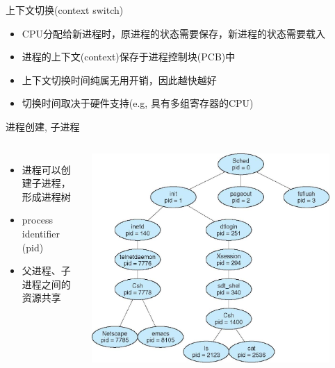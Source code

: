 \documentclass[xcolor=svgnames]{beamer}
\begin{document}
\begin{CJK*}{UTF8}{gbsn}
\begin{frame}{上下文切换(context switch)}
\begin{itemize}
\item CPU分配给新进程时，原进程的状态需要保存，新进程的状态需要载入
\item 进程的上下文(context)保存于进程控制块(PCB)中
\item 上下文切换时间纯属无用开销，因此越快越好
\item 切换时间取决于硬件支持(e.g, 具有多组寄存器的CPU)
\end{itemize}
\end{frame}





\begin{frame}{进程创建, 子进程}
\begin{columns}%
\begin{itemize}
\item 进程可以创建子进程，形成进程树
\item process identifier (pid)
\item 父进程、子进程之间的资源共享
\end{itemize}
\includegraphics[width=0.9\textwidth]{tree.jpg}
\end{columns}%
\end{frame}

\end{CJK*}
\end{document}
